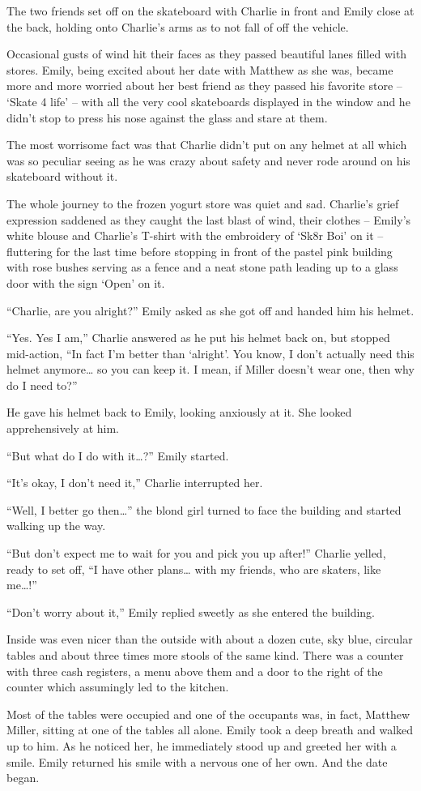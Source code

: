 The two friends set off on the skateboard with Charlie in front and Emily close at the back, holding onto Charlie’s arms as to not fall of off the vehicle.

Occasional gusts of wind hit their faces as they passed beautiful lanes filled with stores. Emily, being excited about her date with Matthew as she was, became more and more worried about her best friend as they passed his favorite store – ‘Skate 4 life’ – with all the very cool skateboards displayed in the window and he didn’t stop to press his nose against the glass and stare at them.

The most worrisome fact was that Charlie didn’t put on any helmet at all which was so peculiar seeing as he was crazy about safety and never rode around on his skateboard without it.

The whole journey to the frozen yogurt store was quiet and sad. Charlie’s grief expression saddened as they caught the last blast of wind, their clothes – Emily’s white blouse and Charlie’s T-shirt with the embroidery of ‘Sk8r Boi’ on it – fluttering for the last time before stopping in front of the pastel pink building with rose bushes serving as a fence and a neat stone path leading up to a glass door with the sign ‘Open’ on it.

“Charlie, are you alright?” Emily asked as she got off and handed him his helmet.

“Yes. Yes I am,” Charlie answered as he put his helmet back on, but stopped mid-action, “In fact I’m better than ‘alright’. You know, I don’t actually need this helmet anymore… so you can keep it. I mean, if Miller doesn’t wear one, then why do I need to?”

He gave his helmet back to Emily, looking anxiously at it. She looked apprehensively at him.

“But what do I do with it…?” Emily started.

“It’s okay, I don’t need it,” Charlie interrupted her.

“Well, I better go then…” the blond girl turned to face the building and started walking up the way.

“But don’t expect me to wait for you and pick you up after!” Charlie yelled, ready to set off, “I have other plans… with my friends, who are skaters, like me…!”

“Don’t worry about it,” Emily replied sweetly as she entered the building.

Inside was even nicer than the outside with about a dozen cute, sky blue, circular tables and about three times more stools of the same kind. There was a counter with three cash registers, a menu above them and a door to the right of the counter which assumingly led to the kitchen.

Most of the tables were occupied and one of the occupants was, in fact, Matthew Miller, sitting at one of the tables all alone. Emily took a deep breath and walked up to him. As he noticed her, he immediately stood up and greeted her with a smile. Emily returned his smile with a nervous one of her own. And the date began.